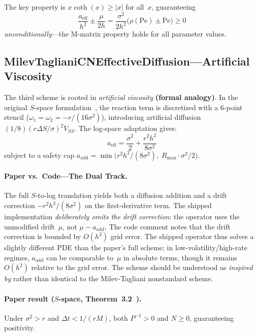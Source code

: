 The key property is $x\coth(x) \ge |x|$ for all~$x$, guaranteeing
\begin{equation}\label{eq:ef-offdiag}
  \frac{a_{\text{eff}}}{h^2} \pm \frac{\mu}{2h}
  = \frac{\sigma^2}{2h^2}\bigl(\rho(\mathrm{Pe}) \pm \mathrm{Pe}\bigr) \ge 0
\end{equation}
\emph{unconditionally}---the M-matrix property holds for all parameter values.

\subsection{MilevTaglianiCNEffectiveDiffusion---Artificial Viscosity}

The third scheme is rooted in \emph{artificial viscosity} \textbf{(formal analogy)}.  In the original $S$-space formulation~\cite{MilevTagliani2010a}, the reaction term is discretized with a 6-point stencil ($\omega_1 = \omega_2 = -r/(16\sigma^2)$), introducing artificial diffusion $(1/8)(r\Delta S/\sigma)^2 V_{SS}$.  The log-space adaptation gives:
\begin{equation}\label{eq:mt-aeff}
  a_{\text{eff}} = \frac{\sigma^2}{2} + \frac{r^2 h^2}{8\sigma^2}
\end{equation}
subject to a safety cap $a_{\text{add}} = \min\!\bigl(r^2 h^2/(8\sigma^2),\; R_{\max} \cdot \sigma^2/2\bigr)$.

\paragraph{Paper vs.\ Code---The Dual Track.}
The full $S$-to-log translation yields both a diffusion addition and a drift correction $-r^2 h^2/(8\sigma^2)$ on the first-derivative term.  The shipped implementation \emph{deliberately omits the drift correction}: the operator uses the unmodified drift~$\mu$, not $\mu - a_{\text{add}}$.  The code comment notes that the drift correction is bounded by $O(h^2)$ grid error.  The shipped operator thus solves a slightly different PDE than the paper's full scheme; in low-volatility/high-rate regimes, $a_{\text{add}}$ can be comparable to~$\mu$ in absolute terms, though it remains $O(h^2)$ relative to the grid error.  The scheme should be understood as \emph{inspired by} rather than identical to the Milev-Tagliani nonstandard scheme.

\paragraph{Paper result ($S$-space, Theorem~3.2~\cite{MilevTagliani2010a}).}
Under $\sigma^2 > r$ and $\Delta t < 1/(rM)$, both $P^{-1} > 0$ and $N \ge 0$, guaranteeing positivity.

